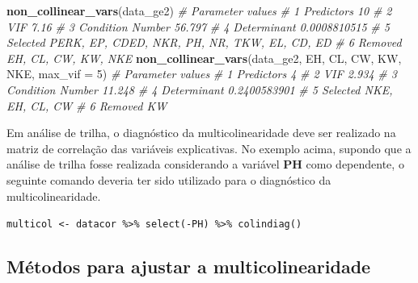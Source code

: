 \documentclass[
]{book}
\newenvironment{Shaded}{\begin{snugshade}}{\end{snugshade}}
\newcommand{\CommentTok}[1]{\textcolor[rgb]{0.56,0.35,0.01}{\textit{#1}}}
\newcommand{\DataTypeTok}[1]{\textcolor[rgb]{0.13,0.29,0.53}{#1}}
\newcommand{\DecValTok}[1]{\textcolor[rgb]{0.00,0.00,0.81}{#1}}
\newcommand{\KeywordTok}[1]{\textcolor[rgb]{0.13,0.29,0.53}{\textbf{#1}}}
\newcommand{\NormalTok}[1]{#1}
\begin{document}
\begin{Shaded}
\begin{Highlighting}[]
\KeywordTok{non_collinear_vars}\NormalTok{(data_ge2)}
\CommentTok{#          Parameter                                       values}
\CommentTok{# 1       Predictors                                           10}
\CommentTok{# 2              VIF                                         7.16}
\CommentTok{# 3 Condition Number                                       56.797}
\CommentTok{# 4      Determinant                                 0.0008810515}
\CommentTok{# 5         Selected PERK, EP, CDED, NKR, PH, NR, TKW, EL, CD, ED}
\CommentTok{# 6          Removed                          EH, CL, CW, KW, NKE}
\KeywordTok{non_collinear_vars}\NormalTok{(data_ge2, EH, CL, CW, KW, NKE, }\DataTypeTok{max_vif =} \DecValTok{5}\NormalTok{)}
\CommentTok{#          Parameter          values}
\CommentTok{# 1       Predictors               4}
\CommentTok{# 2              VIF           2.934}
\CommentTok{# 3 Condition Number          11.248}
\CommentTok{# 4      Determinant    0.2400583901}
\CommentTok{# 5         Selected NKE, EH, CL, CW}
\CommentTok{# 6          Removed              KW}
\end{Highlighting}
\end{Shaded}

\begin{dica}
Em análise de trilha, o diagnóstico da multicolinearidade deve ser realizado na matriz de correlação das variáveis explicativas. No exemplo acima, supondo que a análise de trilha fosse realizada considerando a variável \textbf{PH} como dependente, o seguinte comando deveria ter sido utilizado para o diagnóstico da multicolinearidade.

\texttt{multicol\ \textless{}-\ datacor\ \%\textgreater{}\%\ select(-PH)\ \%\textgreater{}\%\ colindiag()}
\end{dica}

\hypertarget{muxe9todos-para-ajustar-a-multicolinearidade}{%
\subsection{Métodos para ajustar a multicolinearidade}\label{muxe9todos-para-ajustar-a-multicolinearidade}}
\end{document}
